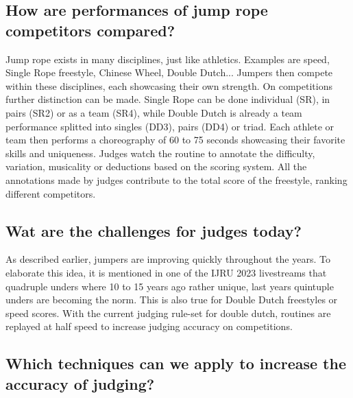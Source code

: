 \subsection{How are performances of jump rope competitors compared?}

Jump rope exists in many disciplines, just like athletics. Examples are speed, Single Rope freestyle, Chinese Wheel, Double Dutch...
Jumpers then compete within these disciplines, each showcasing their own strength. On competitions further distinction can be made. Single Rope can be done individual (SR), in pairs (SR2) or as a team (SR4), while Double Dutch is already a team performance splitted into singles (DD3), pairs (DD4) or triad.
Each athlete or team then performs a choreography of 60 to 75 seconds showcasing their favorite skills and uniqueness. Judges watch the routine to annotate the difficulty, variation, musicality or deductions based on the scoring system. All the annotations made by judges contribute to the total score of the freestyle, ranking different competitors.

\subsection{Wat are the challenges for judges today?}


As described earlier, jumpers are improving quickly throughout the years. To elaborate this idea, it is mentioned in one of the IJRU 2023 livestreams that quadruple unders where 10 to 15 years ago rather unique, last years quintuple unders are becoming the norm. This is also true for Double Dutch freestyles or speed scores. With the current judging rule-set for double dutch, routines are replayed at half speed to increase judging accuracy on competitions.

\subsection{Which techniques can we apply to increase the accuracy of judging?}

